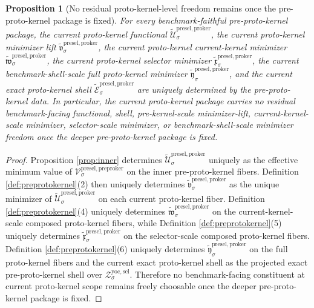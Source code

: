 \documentclass[11pt]{article}
\newcommand{\YoctoSelectorShell}[1]{\mathcal Z_{#1}^{\mathrm{yoc,sel}}}
\newcommand{\PreProtoKernelFunctional}[1]{\mathscr V_{#1}^{\mathrm{presel,preproker}}}
\newcommand{\InducedProtoKernelFunctional}[1]{\widetilde{\mathscr U}_{#1}^{\mathrm{presel,proker}}}
\newcommand{\InducedProtoKernelMinLift}[1]{\widetilde{\mathfrak v}_{#1}^{\mathrm{presel,proker}}}
\newcommand{\InducedProtoKernelKernelMin}[1]{\widetilde{\mathfrak w}_{#1}^{\mathrm{presel,proker}}}
\newcommand{\InducedProtoKernelSelectorMin}[1]{\widetilde{\mathfrak x}_{#1}^{\mathrm{presel,proker}}}
\newcommand{\InducedProtoKernelFullMin}[1]{\widetilde{\mathfrak y}_{#1}^{\mathrm{presel,proker}}}
\newcommand{\InducedProtoKernelShell}[1]{\widetilde{\mathcal E}_{#1}^{\mathrm{presel,proker}}}
\newtheorem{proposition}{Proposition}
\begin{document}
\begin{proposition}[No residual proto-kernel-level freedom remains once the pre-proto-kernel package is fixed]
\label{prop:nofreedom}
For every benchmark-faithful pre-proto-kernel package, the current proto-kernel functional \(\InducedProtoKernelFunctional{\sigma}\), the current proto-kernel minimizer lift \(\InducedProtoKernelMinLift{\sigma}\), the current proto-kernel current-kernel minimizer \(\InducedProtoKernelKernelMin{\sigma}\), the current proto-kernel selector minimizer \(\InducedProtoKernelSelectorMin{\sigma}\), the current benchmark-shell-scale full proto-kernel minimizer \(\InducedProtoKernelFullMin{\sigma}\), and the current exact proto-kernel shell \(\InducedProtoKernelShell{\sigma}\) are uniquely determined by the pre-proto-kernel data. In particular, the current proto-kernel package carries no residual benchmark-facing functional, shell, pre-kernel-scale minimizer-lift, current-kernel-scale minimizer, selector-scale minimizer, or benchmark-shell-scale minimizer freedom once the deeper pre-proto-kernel package is fixed.
\end{proposition}

\begin{proof}
Proposition \ref{prop:inner} determines \(\InducedProtoKernelFunctional{\sigma}\) uniquely as the effective minimum value of \(\PreProtoKernelFunctional{\sigma}\) on the inner pre-proto-kernel fibers. Definition \ref{def:preprotokernel}(2) then uniquely determines \(\InducedProtoKernelMinLift{\sigma}\) as the unique minimizer of \(\InducedProtoKernelFunctional{\sigma}\) on each current proto-kernel fiber. Definition \ref{def:preprotokernel}(4) uniquely determines \(\InducedProtoKernelKernelMin{\sigma}\) on the current-kernel-scale composed proto-kernel fibers, while Definition \ref{def:preprotokernel}(5) uniquely determines \(\InducedProtoKernelSelectorMin{\sigma}\) on the selector-scale composed proto-kernel fibers. Definition \ref{def:preprotokernel}(6) uniquely determines \(\InducedProtoKernelFullMin{\sigma}\) on the full proto-kernel fibers and the current exact proto-kernel shell as the projected exact pre-proto-kernel shell over \(\YoctoSelectorShell{\sigma}\). Therefore no benchmark-facing constituent at current proto-kernel scope remains freely choosable once the deeper pre-proto-kernel package is fixed.
\end{proof}
\end{document}
